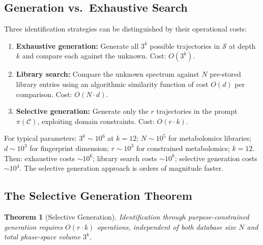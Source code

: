 \documentclass[11pt,twocolumn,a4paper]{article}
\newtheorem{theorem}{Theorem}[section]
\theoremstyle{definition}
\theoremstyle{remark}
\newcommand{\Sspace}{\mathcal{S}}
\newcommand{\Context}{\mathcal{C}}
\newcommand{\Prompt}{\pi}
\begin{document}
\subsection{Generation vs.\ Exhaustive Search}\label{sec:gen-vs-search}

Three identification strategies can be distinguished by their operational costs:

\begin{enumerate}[label=(\roman*)]
  \item \textbf{Exhaustive generation:} Generate all $3^k$ possible trajectories in $\Sspace$ at depth $k$ and compare each against the unknown. Cost: $O(3^k)$.

  \item \textbf{Library search:} Compare the unknown spectrum against $N$ pre-stored library entries using an algorithmic similarity function of cost $O(d)$ per comparison. Cost: $O(N \cdot d)$.

  \item \textbf{Selective generation:} Generate only the $r$ trajectories in the prompt $\Prompt(\Context)$, exploiting domain constraints. Cost: $O(r \cdot k)$.
\end{enumerate}

For typical parameters: $3^k \sim 10^6$ at $k = 12$; $N \sim 10^5$ for metabolomics libraries; $d \sim 10^3$ for fingerprint dimension; $r \sim 10^3$ for constrained metabolomics; $k = 12$. Then: exhaustive costs $\sim$$10^6$; library search costs $\sim$$10^8$; selective generation costs $\sim$$10^4$. The selective generation approach is orders of magnitude faster.

\subsection{The Selective Generation Theorem}\label{sec:selective-gen-thm}

\begin{theorem}[Selective Generation]\label{thm:selective-gen}
Identification through purpose-constrained generation requires $O(r \cdot k)$ operations, independent of both database size $N$ and total phase-space volume $3^k$.
\end{theorem}
\end{document}
